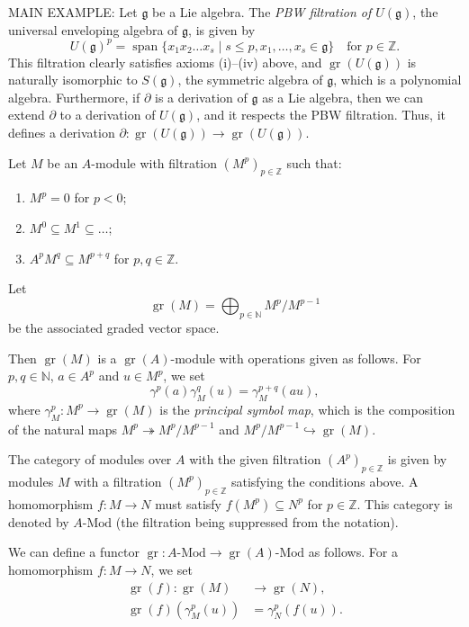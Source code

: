 \documentclass[a4paper, 12pt, reqno]{amsart}
\DeclareMathOperator{\gr}{gr}
\DeclareMathOperator{\vspan}{span}
\begin{document}
MAIN EXAMPLE: Let $\mathfrak{g}$ be a Lie algebra.
The \emph{PBW filtration of $U(\mathfrak{g})$}, the universal enveloping algebra of $\mathfrak{g}$, is given by
\begin{equation*}
  U(\mathfrak{g})^p = \vspan\{x_1x_2\dots x_s \mid s \le p, x_1, \dots, x_s \in \mathfrak{g}\} \quad \text{for $p \in \mathbb{Z}$}.
\end{equation*}
This filtration clearly satisfies axioms (i)--(iv) above, and $\gr(U(\mathfrak{g}))$ is naturally isomorphic to $S(\mathfrak{g})$, the symmetric algebra of $\mathfrak{g}$, which is a polynomial algebra.
Furthermore, if $\partial$ is a derivation of $\mathfrak{g}$ as a Lie algebra, then we can extend $\partial$ to a derivation of $U(\mathfrak{g})$, and it respects the PBW filtration.
Thus, it defines a derivation $\partial: \gr(U(\mathfrak{g})) \to \gr(U(\mathfrak{g}))$.

Let $M$ be an $A$-module with filtration $(M^p)_{p \in \mathbb{Z}}$ such that:
\begin{enumerate}
\item $M^p = 0$ for $p < 0$;
\item $M^0 \subseteq M^1 \subseteq \dots$;
\item $A^pM^q \subseteq M^{p + q}$ for $p, q \in \mathbb{Z}$.
\end{enumerate}
Let
\begin{equation*}
  \gr(M) = \bigoplus_{p \in \mathbb{N}}M^p/M^{p - 1}
\end{equation*}
be the associated graded vector space.

Then $\gr(M)$ is a $\gr(A)$-module with operations given as follows.
For $p, q \in \mathbb{N}$, $a \in A^p$ and $u \in M^p$, we set
\begin{equation*}
  \gamma^p(a)\gamma^q_M(u) = \gamma^{p + q}_M(au),
\end{equation*}
where $\gamma^p_M: M^p \to \gr(M)$ is the \emph{principal symbol map}, which is the composition of the natural maps $M^p \twoheadrightarrow M^p/M^{p - 1}$ and $M^p/M^{p - 1} \hookrightarrow \gr(M)$.

The category of modules over $A$ with the given filtration $(A^p)_{p \in \mathbb{Z}}$ is given by modules $M$ with a filtration $(M^p)_{p \in \mathbb{Z}}$ satisfying the conditions above.
A homomorphism $f: M \to N$ must satisfy $f(M^p) \subseteq N^p$ for $p \in \mathbb{Z}$.
This category is denoted by $A\text{-Mod}$ (the filtration being suppressed from the notation).

We can define a functor $\gr: A\text{-Mod} \to \gr(A)\text{-Mod}$ as follows.
For a homomorphism $f: M \to N$, we set
\begin{align*}
  \gr(f): \gr(M) &\to \gr(N), \\
  \gr(f)(\gamma_M^p(u)) &= \gamma_N^p(f(u)).
\end{align*}
\end{document}

